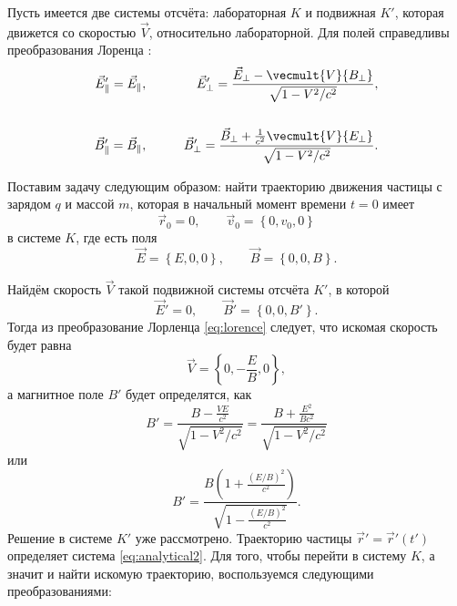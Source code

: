 Пусть имеется две системы отсчёта: лабораторная $K$ и подвижная $K'$, которая движется со скоростью $\vec{V}$, относительно лабораторной. Для полей справедливы  преобразования Лоренца \cite{Landau2}:
\begin{eqnarray}
\vec{E}_{\parallel}' = \vec{E}_{\parallel}, &\qquad& \vec{E}_{\perp}' = \frac{\vec{E}_{\perp} - \vecmult{V}{B_{\perp}}}{\sqrt{1 - V^2/c^2}}, \nonumber
\\  \label{eq:lorence}  \\
\vec{B}_{\parallel}' = \vec{B}_{\parallel}, &\qquad& \vec{B}_{\perp}' = \frac{\vec{B}_{\perp} +  \frac{1}{c^2}\vecmult{V}{E_{\perp}}}{\sqrt{1 - V^2/c^2}}. \nonumber
\end{eqnarray}



Поставим задачу следующим образом: найти траекторию движения частицы с зарядом $q$ и массой $m$, которая в начальный момент времени $t = 0$ имеет
\begin{equation}
\vec{r}_0 = 0, \qquad   \vec{v}_0 = \left\{  0, v_0, 0  \right\}
\end{equation}
в системе $K$, где есть поля
\begin{equation}
\vec{E} = \left\{E, 0 , 0  \right\}  , \qquad \vec{B} = \left\{ 0, 0, B \right\}.
\end{equation}

Найдём скорость $\vec{V}$ такой подвижной системы отсчёта $K'$, в которой
\begin{equation}
\vec{E}' = 0, \qquad \vec{B}' =\left\{ 0, 0, B' \right\}.
\end{equation}
Тогда из преобразование Лорленца \eqref{eq:lorence} следует, что искомая скорость будет равна
\begin{equation}
\vec{V} = \left\{0 ,  - \frac{E}{B} , 0 \right\},
\end{equation}
а магнитное поле $B'$ будет определятся, как
\begin{equation}
B' = \frac{B  - \frac{V E}{c^2}}{\sqrt{1 - V^2/c^2}} = \frac{B  + \frac{ E^2}{Bc^2}}{\sqrt{1 - V^2/c^2}}
\end{equation}
или
\begin{equation}
B'  = \frac{B \left(1 + \frac{(E/B)^2}{c^2}\right)}{\sqrt{1  - \frac{(E/B)^2}{c^2} }}.
\end{equation}
Решение в системе $K'$ уже рассмотрено. Траекторию частицы $\vec{r}' = \vec{r}'(t')$ определяет система \eqref{eq:analytical2}. Для того, чтобы перейти в систему $K$, а значит и найти искомую траекторию, воспользуемся следующими преобразованиями:

